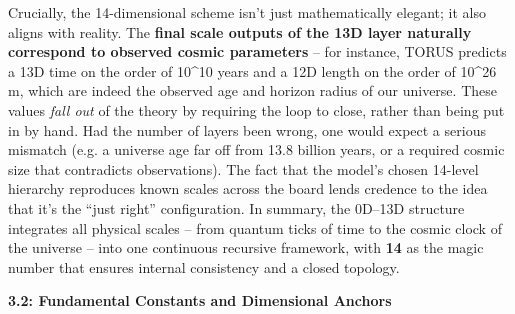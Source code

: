\documentclass[]{article}
\begin{document}
Crucially, the 14-dimensional scheme isn't just mathematically elegant;
it also aligns with reality. The \textbf{final scale outputs of the 13D
layer naturally correspond to observed cosmic parameters} -- for
instance, TORUS predicts a 13D time on the order of 10\^{}10 years and a
12D length on the order of 10\^{}26 m, which are indeed the observed age
and horizon radius of our universe​. These values \emph{fall out} of the
theory by requiring the loop to close, rather than being put in by hand.
Had the number of layers been wrong, one would expect a serious mismatch
(e.g. a universe age far off from 13.8 billion years, or a required
cosmic size that contradicts observations). The fact that the model's
chosen 14-level hierarchy reproduces known scales across the board lends
credence to the idea that it's the ``just right'' configuration. In
summary, the 0D--13D structure integrates all physical scales -- from
quantum ticks of time to the cosmic clock of the universe -- into one
continuous recursive framework, with \textbf{14} as the magic number
that ensures internal consistency and a closed topology​.

\textbf{3.2: Fundamental Constants and Dimensional Anchors}
\end{document}
